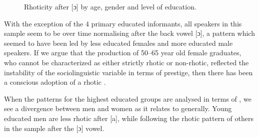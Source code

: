 \begin{figure}
\caption{Rhoticity after [ɔ] by age, gender and level of education.}
\label{fig:5}
\end{figure}

With the exception of the 4 primary educated informants, all speakers in this sample seem to be over time normalising  after the back vowel [ɔ], a pattern which seemed to have been led by less educated females and more educated male speakers.  If we argue that the production of 50--65 year old female graduates, who cannot be characterized as either strictly rhotic or non-rhotic, reflected the instability of the sociolinguistic variable in terms of prestige, then there has been a conscious adoption of a rhotic .

When the patterns for the highest educated groups are analysed in terms of , we see a divergence between men and women as it relates to  generally.  Young educated men are less rhotic after [a], while following the rhotic pattern of others in the sample after the [ɔ] vowel.

